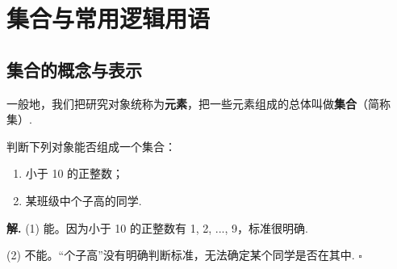 \chapter{集合与常用逻辑用语}

\section{集合的概念与表示}

\begin{definition}[集合]
一般地，我们把研究对象统称为\textbf{元素}，把一些元素组成的总体叫做\textbf{集合}（简称集）. 
\end{definition}

\begin{example}
判断下列对象能否组成一个集合：
\begin{enumerate}
    \item 小于 10 的正整数；
    \item 某班级中个子高的同学.
\end{enumerate}
\end{example}

\textbf{解.} 
(1) 能。因为小于 10 的正整数有 1, 2, ..., 9，标准很明确.

(2) 不能。“个子高”没有明确判断标准，无法确定某个同学是否在其中. \hfill $\square$
